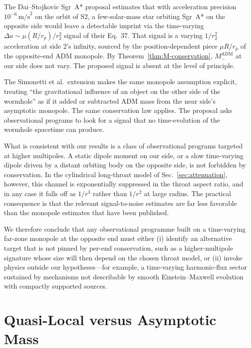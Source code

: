 \documentclass[aps,prd,onecolumn,nofootinbib,superscriptaddress]{revtex4-2}
\begin{document}
The Dai--Stojkovic Sgr~A* proposal\cite{DaiStojkovic2019Observing} estimates that with acceleration precision $10^{-6}\,\mathrm{m/s}^2$ on the orbit of S2, a few-solar-mass star orbiting Sgr~A* on the opposite side would leave a detectable imprint via the time-varying $\Delta a \sim \mu (R/r_p)/r_2^2$ signal of their Eq.~37. That signal is a varying $1/r_2^2$ acceleration at side 2's infinity, sourced by the position-dependent piece $\mu R/r_p$ of the opposite-end ADM monopole. By Theorem~\ref{thm:M-conservation}, $M_-^{\mathrm{ADM}}$ at our side does not vary. The proposed signal is absent at the level of principle.

The Simonetti et al.\ extension\cite{SimonettiEtAl2021SensitiveSearches} makes the same monopole assumption explicit, treating ``the gravitational influence of an object on the other side of the wormhole'' as if it added or subtracted ADM mass from the near side's asymptotic monopole. The same conservation law applies. The proposal asks observational programs to look for a signal that no time-evolution of the wormhole spacetime can produce.

What is consistent with our results is a class of observational programs targeted at higher multipoles. A static dipole moment on our side, or a slow time-varying dipole driven by a distant orbiting body on the opposite side, is not forbidden by conservation. In the cylindrical long-throat model of Sec.~\ref{sec:attenuation}, however, this channel is exponentially suppressed in the throat aspect ratio, and in any case it falls off as $1/r^3$ rather than $1/r^2$ at large radius. The practical consequence is that the relevant signal-to-noise estimates are far less favorable than the monopole estimates that have been published.

We therefore conclude that any observational programme built on a time-varying far-zone monopole at the opposite end must either (i) identify an alternative target that is not pinned by per-end conservation, such as a higher-multipole signature whose size will then depend on the chosen throat model, or (ii) invoke physics outside our hypotheses---for example, a time-varying harmonic-flux sector sustained by mechanisms not describable by smooth Einstein--Maxwell evolution with compactly supported sources.

\section{Quasi-Local versus Asymptotic Mass}
\label{sec:quasilocal}
\end{document}
